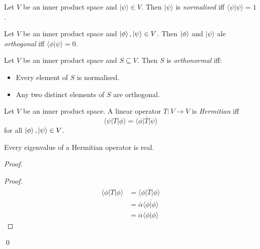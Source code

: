 \begin{df}[Normalised]
Let $V$ be an inner product space and $|\psi\rangle \in V$. Then $|\psi\rangle$ is \emph{normalised} iff $\langle \psi | \psi \rangle = 1$.
\end{df} 

\begin{df}[Orthogonal]
Let $V$ be an inner product space and $\left| {\phi} \right\rangle, |\psi\rangle \in V$. Then $\left| {\phi} \right\rangle$ and $|\psi\rangle$ ale \emph{orthogonal} iff $\langle \phi | \psi \rangle = 0$.
\end{df} 

\begin{df}[Orthonormal]
Let $V$ be an inner product space and $S \subseteq V$. Then $S$ is \emph{orthonormal} iff:
\begin{itemize}
\item Every element of $S$ is normalised.
\item Any two distinct elements of $S$ are orthogonal.
\end{itemize}
\end{df}

\begin{df}[Hermitian]
Let $V$ be an inner product space. A linear operator $T : V \rightarrow V$ is \emph{Hermitian} iff
\[ \langle \psi | T | \phi \rangle = \overline{\langle \phi | T | \psi \rangle} \]
for all $\left| {\phi} \right\rangle, \left| {\psi} \right\rangle \in V$.
\end{df}

\begin{prop}
Every eigenvalue of a Hermitian operator is real.
\end{prop}

\begin{proof}
\pf
{}
\begin{proof}
	\pf
	\begin{align*}
		\langle \phi | T | \phi \rangle & = \overline{\langle \phi | T | \phi \rangle} \\
		& = \overline{\alpha} \overline{\langle \phi | \phi \rangle} \\
		& = \overline{\alpha} \langle \phi | \phi \rangle
	\end{align*}
\end{proof}
\qed
\end{proof}


